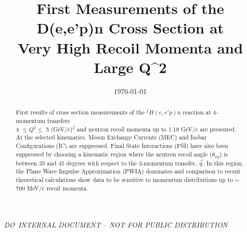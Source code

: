 \documentclass[aps,prl,twocolumn,showpacs,superscriptaddress,groupedaddress]{revtex4-2}  %
\begin{document}
\widetext
{}
\centerline{\em D\O\ INTERNAL DOCUMENT -- NOT FOR PUBLIC DISTRIBUTION}


\title{First Measurements of the D(e,e'p)n Cross Section at \\ Very High Recoil Momenta and Large Q^{2}}
\date{\today}


\begin{abstract}
  First results of cross section measurements of the $^{2}H(e,e'p)n$ reaction at 4-momentum transfers \\ 4 $\leq Q^{2}\leq$ 5 (GeV/c)$^{2}$  and
  neutron recoil momenta up to 1.18 GeV/c are presented. At the selected kinematics, Meson Exchange Currents (MEC) and Isobar
  Configurations (IC) are suppressed. Final State Interactions (FSI) have also been suppressed by choosing a kinematic region where the neutron recoil
  angle ($\theta_{nq}$) is between 35 and 45 degrees with respect to the 3-momentum transfer, $\vec{q}$. In this region, the Plane Wave Impulse Approximation (PWIA)
  dominates and comparison to recent theoretical calculations show data to be sensitive to momentum distributions up to $\sim$ 700 MeV/c recoil momenta.
  
  
  
\end{abstract}
\end{document}
